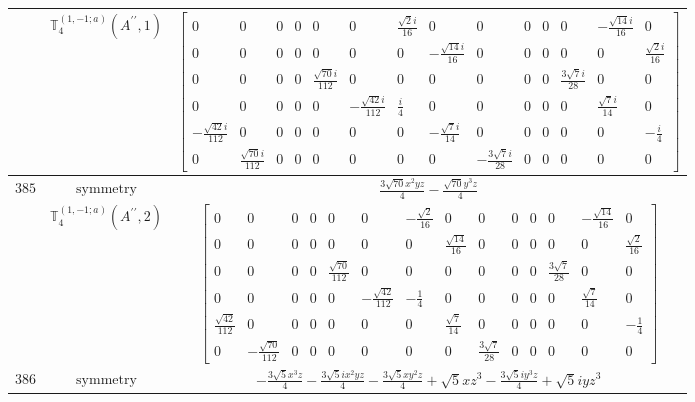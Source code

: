 \documentclass[fleqn,8pt,landscape]{jsarticle}
\begin{document}
\begin{longtable}{ccc}
$  $ & $ \mathbb{T}_{4}^{(1,-1;a)}(A^{\prime\prime},1) $ & $ \begin{bmatrix} 0 & 0 & 0 & 0 & 0 & 0 & \frac{\sqrt{2} i}{16} & 0 & 0 & 0 & 0 & 0 & - \frac{\sqrt{14} i}{16} & 0 \\ 0 & 0 & 0 & 0 & 0 & 0 & 0 & - \frac{\sqrt{14} i}{16} & 0 & 0 & 0 & 0 & 0 & \frac{\sqrt{2} i}{16} \\ 0 & 0 & 0 & 0 & \frac{\sqrt{70} i}{112} & 0 & 0 & 0 & 0 & 0 & 0 & \frac{3 \sqrt{7} i}{28} & 0 & 0 \\ 0 & 0 & 0 & 0 & 0 & - \frac{\sqrt{42} i}{112} & \frac{i}{4} & 0 & 0 & 0 & 0 & 0 & \frac{\sqrt{7} i}{14} & 0 \\ - \frac{\sqrt{42} i}{112} & 0 & 0 & 0 & 0 & 0 & 0 & - \frac{\sqrt{7} i}{14} & 0 & 0 & 0 & 0 & 0 & - \frac{i}{4} \\ 0 & \frac{\sqrt{70} i}{112} & 0 & 0 & 0 & 0 & 0 & 0 & - \frac{3 \sqrt{7} i}{28} & 0 & 0 & 0 & 0 & 0 \end{bmatrix} $ \\ \hline
$ 385 $ & $ \text{symmetry} $ & $ \frac{3 \sqrt{70} x^{2} y z}{4} - \frac{\sqrt{70} y^{3} z}{4} $ \\
$  $ & $ \mathbb{T}_{4}^{(1,-1;a)}(A^{\prime\prime},2) $ & $ \begin{bmatrix} 0 & 0 & 0 & 0 & 0 & 0 & - \frac{\sqrt{2}}{16} & 0 & 0 & 0 & 0 & 0 & - \frac{\sqrt{14}}{16} & 0 \\ 0 & 0 & 0 & 0 & 0 & 0 & 0 & \frac{\sqrt{14}}{16} & 0 & 0 & 0 & 0 & 0 & \frac{\sqrt{2}}{16} \\ 0 & 0 & 0 & 0 & \frac{\sqrt{70}}{112} & 0 & 0 & 0 & 0 & 0 & 0 & \frac{3 \sqrt{7}}{28} & 0 & 0 \\ 0 & 0 & 0 & 0 & 0 & - \frac{\sqrt{42}}{112} & - \frac{1}{4} & 0 & 0 & 0 & 0 & 0 & \frac{\sqrt{7}}{14} & 0 \\ \frac{\sqrt{42}}{112} & 0 & 0 & 0 & 0 & 0 & 0 & \frac{\sqrt{7}}{14} & 0 & 0 & 0 & 0 & 0 & - \frac{1}{4} \\ 0 & - \frac{\sqrt{70}}{112} & 0 & 0 & 0 & 0 & 0 & 0 & \frac{3 \sqrt{7}}{28} & 0 & 0 & 0 & 0 & 0 \end{bmatrix} $ \\ \hline
$ 386 $ & $ \text{symmetry} $ & $ - \frac{3 \sqrt{5} x^{3} z}{4} - \frac{3 \sqrt{5} i x^{2} y z}{4} - \frac{3 \sqrt{5} x y^{2} z}{4} + \sqrt{5} x z^{3} - \frac{3 \sqrt{5} i y^{3} z}{4} + \sqrt{5} i y z^{3} $ \\

\end{longtable}
\end{document}
